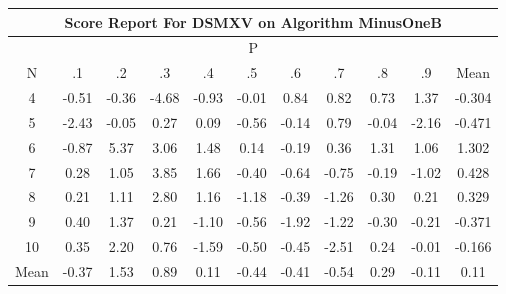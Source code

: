 \documentclass[11pt,a4paper]{report}
\begin{document}
\begin{longtable}{ | c || c | c | c | c | c | c | c | c | c || c |}
\hline
\multicolumn{11}{|c|}{ Score Report For DSMXV on Algorithm MinusOneB} \\
\hline
\multicolumn{11}{|c|}{ P } \\
\hline
N & .1 & .2 & .3 & .4 & .5 & .6 & .7 & .8 & .9 & Mean\\
 \hline
 \hline
 \endhead
  4 &  \cellcolor[HTML]{FFEFEF} -0.51 &  \cellcolor[HTML]{FFF7F7} -0.36 &  \cellcolor[HTML]{FF8787} -4.68 &  \cellcolor[HTML]{FFE7E7} -0.93 &  \cellcolor[HTML]{FFFFFF} -0.01 &  \cellcolor[HTML]{E7E7FF} 0.84 &  \cellcolor[HTML]{E7E7FF} 0.82 &  \cellcolor[HTML]{EFEFFF} 0.73 &  \cellcolor[HTML]{DFDFFF} 1.37 & -0.304 \\
  5 &  \cellcolor[HTML]{FFBFBF} -2.43 &  \cellcolor[HTML]{FFFFFF} -0.05 &  \cellcolor[HTML]{F7F7FF} 0.27 &  \cellcolor[HTML]{FFFFFF} 0.09 &  \cellcolor[HTML]{FFEFEF} -0.56 &  \cellcolor[HTML]{FFFFFF} -0.14 &  \cellcolor[HTML]{EFEFFF} 0.79 &  \cellcolor[HTML]{FFFFFF} -0.04 &  \cellcolor[HTML]{FFC7C7} -2.16 & -0.471 \\
  6 &  \cellcolor[HTML]{FFE7E7} -0.87 &  \cellcolor[HTML]{7878FF} 5.37 &  \cellcolor[HTML]{AFAFFF} 3.06 &  \cellcolor[HTML]{D7D7FF} 1.48 &  \cellcolor[HTML]{FFFFFF} 0.14 &  \cellcolor[HTML]{FFF7F7} -0.19 &  \cellcolor[HTML]{F7F7FF} 0.36 &  \cellcolor[HTML]{DFDFFF} 1.31 &  \cellcolor[HTML]{E7E7FF} 1.06 & 1.302 \\
  7 &  \cellcolor[HTML]{F7F7FF} 0.28 &  \cellcolor[HTML]{E7E7FF} 1.05 &  \cellcolor[HTML]{9F9FFF} 3.85 &  \cellcolor[HTML]{D7D7FF} 1.66 &  \cellcolor[HTML]{FFF7F7} -0.40 &  \cellcolor[HTML]{FFEFEF} -0.64 &  \cellcolor[HTML]{FFEFEF} -0.75 &  \cellcolor[HTML]{FFF7F7} -0.19 &  \cellcolor[HTML]{FFE7E7} -1.02 & 0.428 \\
  8 &  \cellcolor[HTML]{F7F7FF} 0.21 &  \cellcolor[HTML]{DFDFFF} 1.11 &  \cellcolor[HTML]{B7B7FF} 2.80 &  \cellcolor[HTML]{DFDFFF} 1.16 &  \cellcolor[HTML]{FFDFDF} -1.18 &  \cellcolor[HTML]{FFF7F7} -0.39 &  \cellcolor[HTML]{FFDFDF} -1.26 &  \cellcolor[HTML]{F7F7FF} 0.30 &  \cellcolor[HTML]{F7F7FF} 0.21 & 0.329 \\
  9 &  \cellcolor[HTML]{F7F7FF} 0.40 &  \cellcolor[HTML]{DFDFFF} 1.37 &  \cellcolor[HTML]{F7F7FF} 0.21 &  \cellcolor[HTML]{FFE7E7} -1.10 &  \cellcolor[HTML]{FFEFEF} -0.56 &  \cellcolor[HTML]{FFCFCF} -1.92 &  \cellcolor[HTML]{FFDFDF} -1.22 &  \cellcolor[HTML]{FFF7F7} -0.30 &  \cellcolor[HTML]{FFF7F7} -0.21 & -0.371 \\
  10 &  \cellcolor[HTML]{F7F7FF} 0.35 &  \cellcolor[HTML]{C7C7FF} 2.20 &  \cellcolor[HTML]{EFEFFF} 0.76 &  \cellcolor[HTML]{FFD7D7} -1.59 &  \cellcolor[HTML]{FFEFEF} -0.50 &  \cellcolor[HTML]{FFF7F7} -0.45 &  \cellcolor[HTML]{FFBFBF} -2.51 &  \cellcolor[HTML]{F7F7FF} 0.24 &  \cellcolor[HTML]{FFFFFF} -0.01 & -0.166 \\
 \hline
 \hline
Mean &  \cellcolor[HTML]{FFF7F7} -0.37 &  \cellcolor[HTML]{D7D7FF} 1.53 &  \cellcolor[HTML]{E7E7FF} 0.89 &  \cellcolor[HTML]{FFFFFF} 0.11 &  \cellcolor[HTML]{FFF7F7} -0.44 &  \cellcolor[HTML]{FFF7F7} -0.41 &  \cellcolor[HTML]{FFEFEF} -0.54 &  \cellcolor[HTML]{F7F7FF} 0.29 &  \cellcolor[HTML]{FFFFFF} -0.11 &  \cellcolor[HTML]{FFFFFF} 0.11
\end{longtable}
\end{document}
